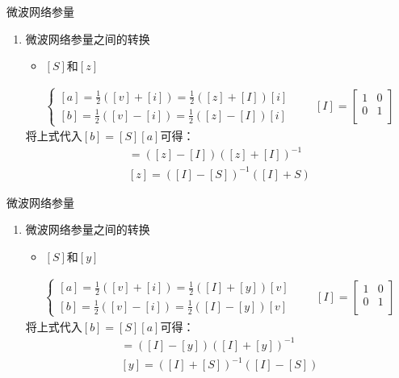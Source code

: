 \begin{frame}{微波网络参量}
    \begin{enumerate}
        \resume
        \item 微波网络参量之间的转换
              \begin{itemize}
                  \item $[S]$和$[z]$
              \end{itemize}
              \begin{align*}
                  \begin{cases}
                      [a]=\frac{1}{2}([v]+[i])=\frac{1}{2}([z]+[I])[i] \\
                      [b]=\frac{1}{2}([v]-[i])=\frac{1}{2}([z]-[I])[i]
                  \end{cases}
                  \qquad
                  [I]=\begin{bmatrix*}
                          1 & 0 \\
                          0 & 1 \\
                      \end{bmatrix*}
              \end{align*}
              将上式代入$[b]=[S][a]$可得：
              \begin{gather*}
                  [S]=([z]-[I])([z]+[I])^{-1}\\
                  [z]=([I]-[S])^{-1}([I]+{S})
              \end{gather*}
    \end{enumerate}
\end{frame}

\begin{frame}{微波网络参量}
    \begin{enumerate}
        \resume
        \item 微波网络参量之间的转换
              \begin{itemize}
                  \item $[S]$和$[y]$
              \end{itemize}
              \begin{align*}
                  \begin{cases}
                      [a]=\frac{1}{2}([v]+[i])=\frac{1}{2}([I]+[y])[v] \\
                      [b]=\frac{1}{2}([v]-[i])=\frac{1}{2}([I]-[y])[v]
                  \end{cases}
                  \qquad
                  [I]=\begin{bmatrix*}
                          1 & 0 \\
                          0 & 1 \\
                      \end{bmatrix*}
              \end{align*}
              将上式代入$[b]=[S][a]$可得：
              \begin{gather*}
                  [S]=([I]-[y])([I]+[y])^{-1}\\
                  [y]=([I]+[S])^{-1}([I]-[S])
              \end{gather*}
    \end{enumerate}
\end{frame}

